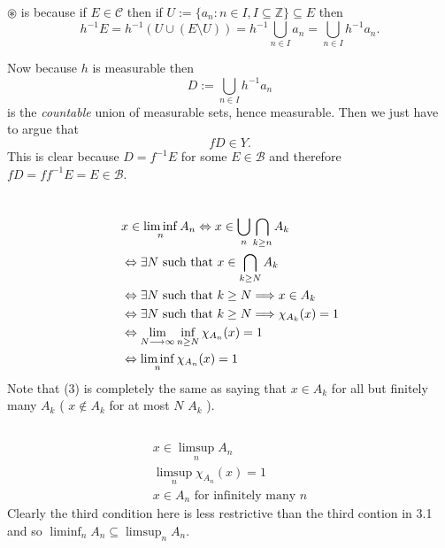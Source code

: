 \documentclass{unswmaths}
\begin{document}
$ \circledast $ is because if $ E \in \mathcal{C} $ then if $ U := \{ a_n  : n \in I, I \subseteq \mathbb{Z} \} \subseteq E $ then 
$$ h^{-1} E = h^{-1} \left(U \cup \left(E \setminus U \right)\right) = h^{-1} \bigcup_{n\in I} a_n = \bigcup_{n \in I} h^{-1} a_n. $$

Now because $ h $ is measurable then 
$$
    D := \bigcup_{n \in I} h^{-1}a_n
$$
is the \emph{countable} union of measurable sets, hence measurable.
Then we just have to argue that
$$
    fD \in Y.
$$
This is clear because $ D = f^{-1} E $ for some $ E \in \mathcal{B} $ and therefore $ fD = ff^{-1}E = E \in \mathcal{B} $.


\section{}
\subsection{}
\begin{align}
    & x \in \liminf_n A_n \Leftrightarrow x \in \bigcup_n \bigcap_{k\geq n} A_k \\
    & \Leftrightarrow \exists N \text{ such that } x \in \bigcap_{k\geq N} A_k \\
    & \Leftrightarrow \exists N \text{ such that } k \geq N \Longrightarrow x \in A_k \\
    & \Leftrightarrow \exists N \text{ such that } k \geq N \Longrightarrow \chi_{A_k}(x) = 1 \\
    & \Leftrightarrow \lim_{N \longrightarrow \infty} \inf_{n \geq N} \chi_{A_n}(x) = 1 \\
    & \Leftrightarrow \liminf_{n} \chi_{A_n}(x) = 1
\end{align}
Note that (3) is completely the same as saying that $ x \in A_k $ for all but finitely many $ A_k $ ( $ x \not\in A_k $ for at most $ N $ $ A_k $ ).
\subsection{}

\begin{align*}
    x \in \limsup_{n} A_n \\
    \limsup_{n} \chi_{A_n}(x) = 1\\
    x \in A_n \text{ for infinitely many } n 
\end{align*}
Clearly the third condition here is less restrictive than the third contion in 3.1 and so $ \liminf_n A_n \subseteq \limsup_n A_n $.
\section{}
\end{document}
